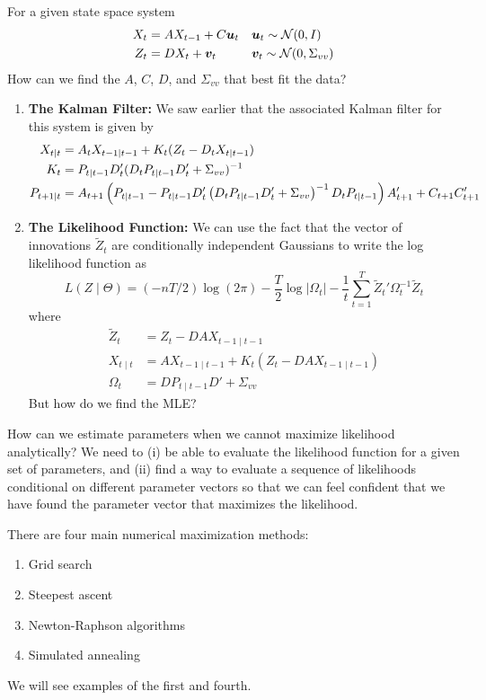 \documentclass[10pt]{article}
\begin{document}
\begin{example}
	 For a given state space system \begin{align*} X_t &= AX_{t-1} + C\bm{u}_t  &&\bm{u}_t \sim \mathcal{N}(0,I) \\ Z_t &= DX_t + \bm{v}_t &&\bm{v}_t \sim \mathcal{N}(0,\Sigma_{vv})\end{align*}How can we find the $A$, $C$, $D$, and $\Sigma_{vv}$ that best fit the data?
	\begin{enumerate}
		\item \textbf{The Kalman Filter:} We saw earlier that the associated Kalman filter for this system is given by \begin{align*} X_{t\mid t} &= A_t X_{t-1\mid t-1} + K_t(Z_t - D_t X_{t\mid t-1}) \\ K_t &= P_{t\mid t-1} D_t'(D_tP_{t\mid t-1}D_t' + \Sigma_{vv})^{-1} \\ P_{t+1\mid t} &= A_{t+1} \left( P_{t\mid t-1} - P_{t\mid t-1}D'_t \left( D_t P_{t\mid t-1} D_t' + \Sigma_{vv}\right)^{-1} D_t P_{t\mid t-1}\right) A'_{t+1} + C_{t+1}C'_{t+1}	\end{align*}
		\item \textbf{The Likelihood Function:} We can use the fact that the vector of innovations $\tilde{Z}_t$ are conditionally independent Gaussians to write the log likelihood function as\[L(Z\mid \Theta) = (-nT/2)\log(2\pi) - \frac{T}{2} \log |\Omega_t| - \frac{1}{t}\sum_{t=1}^T \tilde{Z}_t' \Omega_t^{-1}\tilde{Z}_t\]where \begin{align*} \tilde{Z}_t &= Z_t - DAX_{t-1\mid t-1} \\ X_{t\mid t} &= AX_{t-1\mid t-1} + K_t(Z_t - DAX_{t-1\mid t-1}) \\ \Omega_t &= DP_{t\mid t-1}D' + \Sigma_{vv}\end{align*}But how do we find the MLE?
	\end{enumerate}
\end{example}

\begin{question}
	How can we estimate parameters when we cannot maximize likelihood analytically? We need to (i) be able to evaluate the likelihood function for a given set of parameters, and (ii) find a way to evaluate a sequence of likelihoods conditional on different parameter vectors so that we can feel confident that we have found the parameter vector that maximizes the likelihood. 
	
	There are four main numerical maximization methods:
	\begin{enumerate}
		\item Grid search
		\item Steepest ascent
		\item Newton-Raphson algorithms
		\item Simulated annealing
	\end{enumerate}
	We will see examples of the first and fourth.
\end{question}
\end{document}
